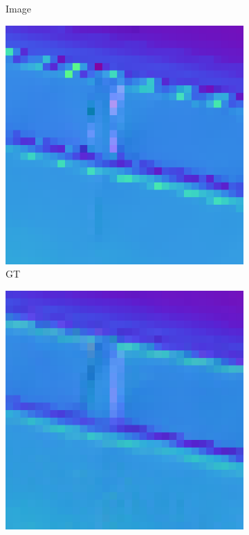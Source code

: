 \begin{figure}
\begin{subfigure}[b]{0.19\linewidth}
	\caption{Image}
	\end{subfigure}
	\begin{subfigure}[b]{0.19\linewidth}
		\includegraphics[width=\linewidth]{./Figures/gcnn_synthetic/eval_9_normal_GT.png}
		\caption{GT}
	\end{subfigure}
	\begin{subfigure}[b]{0.19\linewidth}
		\includegraphics[width=\linewidth]{./Figures/gcnn_synthetic/eval_9_normal_an2-8-1000.png}

\end{subfigure}
\end{figure}
